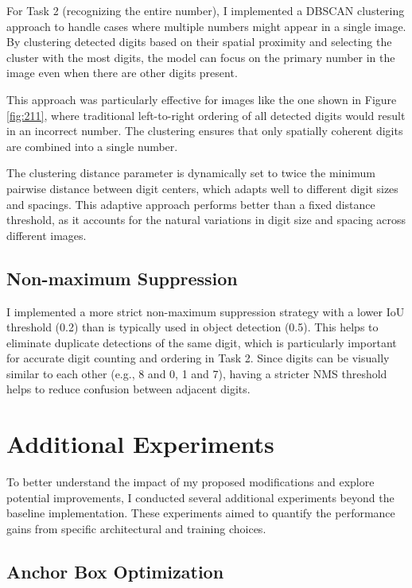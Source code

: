 \documentclass[twocolumn,a4paper]{article}
\begin{document}
For Task 2 (recognizing the entire number), I implemented a DBSCAN clustering approach to handle cases where multiple numbers might appear in a single image. By clustering detected digits based on their spatial proximity and selecting the cluster with the most digits, the model can focus on the primary number in the image even when there are other digits present.

This approach was particularly effective for images like the one shown in Figure \ref{fig:211}, where traditional left-to-right ordering of all detected digits would result in an incorrect number. The clustering ensures that only spatially coherent digits are combined into a single number.

The clustering distance parameter is dynamically set to twice the minimum pairwise distance between digit centers, which adapts well to different digit sizes and spacings. This adaptive approach performs better than a fixed distance threshold, as it accounts for the natural variations in digit size and spacing across different images.

\subsection{Non-maximum Suppression}

I implemented a more strict non-maximum suppression strategy with a lower IoU threshold (0.2) than is typically used in object detection (0.5). This helps to eliminate duplicate detections of the same digit, which is particularly important for accurate digit counting and ordering in Task 2. Since digits can be visually similar to each other (e.g., 8 and 0, 1 and 7), having a stricter NMS threshold helps to reduce confusion between adjacent digits.

\section{Additional Experiments}

To better understand the impact of my proposed modifications and explore potential improvements, I conducted several additional experiments beyond the baseline implementation. These experiments aimed to quantify the performance gains from specific architectural and training choices.

\subsection{Anchor Box Optimization}
\end{document}
